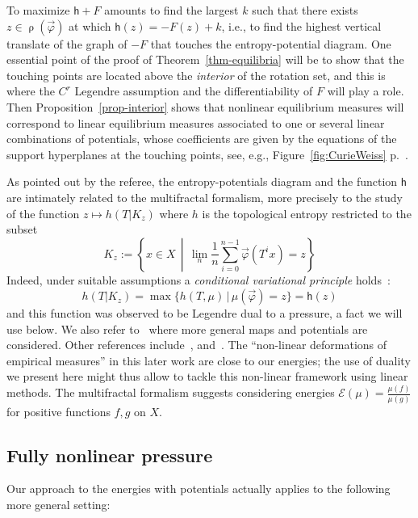 \documentclass[AHL, Unicode, longabstracts,published]{cedram}
\theoremstyle{plain}
\theoremstyle{plain}
\newcommand\vpot{\vec\pot}
\newcommand{\rs}{\operatorname{\rho}}
\newcommand{\hf}{\mathsf{h}}
\newcommand{\pot}{\varphi}
\newcounter{In}
\newcommand*\8{\infty}
\newcommand{\En}{\mathcal{E}}
\begin{document}
\begin{rema}
To maximize $\hf+F$ amounts to find the largest $k$ such that there exists $ z\in\rs(\vpot)$ at which $\hf(z) = -F(z)+k$, i.e., to find the highest vertical translate of the graph of $-F$ that touches the entropy-potential diagram. One essential point of the proof of Theorem~\ref{thm-equilibria} will be to show that the touching points are located above the \emph{interior} of the rotation set, and this is where the $C^r$ Legendre assumption and the differentiability of $F$ will play a role. Then Proposition~\ref{prop-interior} shows that nonlinear equilibrium measures will correspond to linear equilibrium measures associated to one or several linear combinations of potentials, whose coefficients are given by the equations of the support hyperplanes at the touching points, see, e.g., Figure~\ref{fig:CurieWeiss} p.~\pageref{fig:CurieWeiss}.
\end{rema}


\begin{rema}\label{r:multifractal}
As pointed out by the referee, the entropy-potentials diagram and the function $\hf$ are intimately related to the multifractal formalism, more precisely to the study of the function $z \mapsto h(T|K_z)$ where $h$ is the topological entropy restricted to the subset
\[
K_z := \left\{x\in X \,\middle|\, \lim_n \frac1n\sum_{i=0}^{n-1}\vec\varphi\left(T^i x\right) = z \right\}
\]
Indeed, under suitable assumptions a \emph{conditional variational principle} holds~\cite{BarreiraSaussolSchmeling2002}:
\[
h(T|K_z) = \max\big\{ h(T,\mu) \,\big|\, \mu(\vec\varphi) = z \big\} = \hf(z)
\]
and this function was observed to be Legendre dual to a pressure, a fact we will use below. We also refer to~\cite{PfisterSullivan2007,TakensVerbitskiy2003} where more general maps and potentials are considered. Other references include~\cite{BarreiraSaussol2001,Climenhaga2013,Olivier1998}, and~\cite{Olsen2003}. The ``non-linear deformations of empirical measures'' in this later work are close to our energies; the use of duality we present here might thus allow to tackle this non-linear framework using linear methods. The multifractal formalism suggests considering energies $\En(\mu)=\frac{\mu(f)}{\mu(g)}$ for positive functions $f, g$ on $X$.
\end{rema}



\subsection{Fully nonlinear pressure}
Our approach to the energies with potentials actually applies to the following more general setting:
\end{document}
